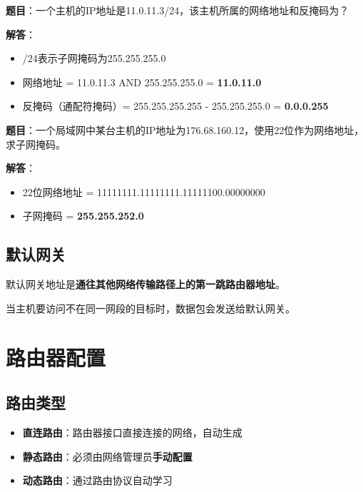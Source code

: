 \documentclass[12pt,a4paper]{ctexart}
\begin{document}
\begin{exambox}[常考题型]
\textbf{题目}：一个主机的IP地址是11.0.11.3/24，该主机所属的网络地址和反掩码为？

\textbf{解答}：
\begin{itemize}[itemsep=0pt]
    \item /24表示子网掩码为255.255.255.0
    \item 网络地址 = 11.0.11.3 AND 255.255.255.0 = \textbf{11.0.11.0}
    \item 反掩码（通配符掩码）= 255.255.255.255 - 255.255.255.0 = \textbf{0.0.0.255}
\end{itemize}
\end{exambox}

\begin{exambox}[常考题型]
\textbf{题目}：一个局域网中某台主机的IP地址为176.68.160.12，使用22位作为网络地址，求子网掩码。

\textbf{解答}：
\begin{itemize}[itemsep=0pt]
    \item 22位网络地址 = 11111111.11111111.11111100.00000000
    \item 子网掩码 = \textbf{255.255.252.0}
\end{itemize}
\end{exambox}

\subsection{默认网关}

\begin{keybox}
默认网关地址是\textbf{通往其他网络传输路径上的第一跳路由器地址}。

当主机要访问不在同一网段的目标时，数据包会发送给默认网关。
\end{keybox}

\section{路由器配置}

\subsection{路由类型}

\begin{itemize}[leftmargin=2em,itemsep=0pt]
    \item \textbf{直连路由}：路由器接口直接连接的网络，自动生成
    \item \textbf{静态路由}：必须由网络管理员\textbf{手动配置}
    \item \textbf{动态路由}：通过路由协议自动学习
\end{itemize}
\end{document}
